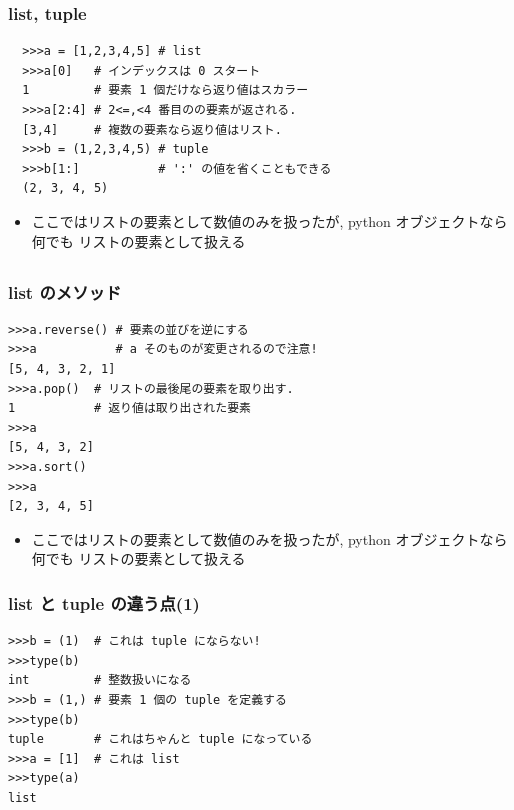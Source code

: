 \begin{frame}[t,fragile]
 \frametitle{list, tuple}
 \begin{lstlisting}
  >>>a = [1,2,3,4,5] # list
  >>>a[0]   # インデックスは 0 スタート
  1         # 要素 1 個だけなら返り値はスカラー
  >>>a[2:4] # 2<=,<4 番目のの要素が返される. 
  [3,4]     # 複数の要素なら返り値はリスト. 
  >>>b = (1,2,3,4,5) # tuple
  >>>b[1:]           # ':' の値を省くこともできる
  (2, 3, 4, 5)
 \end{lstlisting}
 \begin{itemize}
  \item ここではリストの要素として数値のみを扱ったが, python オブジェクトなら何でも リストの要素として扱える
 \end{itemize}
\end{frame}

\subsection*{\redm\whitem\greenb}

\begin{frame}[t,fragile]
\frametitle{list のメソッド}
\begin{lstlisting}
>>>a.reverse() # 要素の並びを逆にする
>>>a           # a そのものが変更されるので注意!
[5, 4, 3, 2, 1]
>>>a.pop()  # リストの最後尾の要素を取り出す. 
1           # 返り値は取り出された要素
>>>a
[5, 4, 3, 2]
>>>a.sort()
>>>a
[2, 3, 4, 5]
\end{lstlisting}
\begin{itemize}
\item ここではリストの要素として数値のみを扱ったが, python オブジェクトなら何でも リストの要素として扱える
\end{itemize}
\end{frame}




\begin{frame}[t,fragile]
\frametitle{list と tuple の違う点(1)}
\begin{lstlisting}
>>>b = (1)  # これは tuple にならない!
>>>type(b)
int         # 整数扱いになる
>>>b = (1,) # 要素 1 個の tuple を定義する
>>>type(b)
tuple       # これはちゃんと tuple になっている
>>>a = [1]  # これは list
>>>type(a)
list
\end{lstlisting}
\end{frame}

